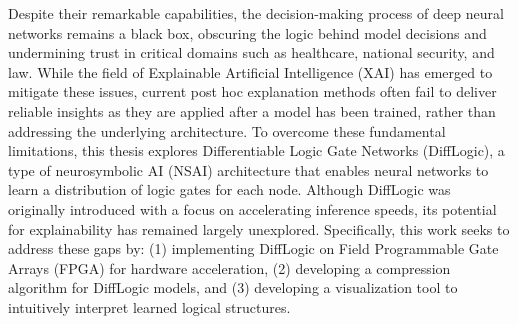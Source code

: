 
Despite their remarkable capabilities, the decision-making process of deep neural networks remains a black box, obscuring the logic behind model decisions and undermining trust in critical domains such as healthcare, national security, and law. While the field of Explainable Artificial Intelligence (XAI) has emerged to mitigate these issues, current post hoc explanation methods often fail to deliver reliable insights as they are applied after a model has been trained, rather than addressing the underlying architecture. To overcome these fundamental limitations, this thesis explores Differentiable Logic Gate Networks (DiffLogic), a type of neurosymbolic AI (NSAI) architecture that enables neural networks to learn a distribution of logic gates for each node. Although DiffLogic was originally introduced with a focus on accelerating inference speeds, its potential for explainability has remained largely unexplored. Specifically, this work seeks to address these gaps by: (1) implementing DiffLogic on Field Programmable Gate Arrays (FPGA) for hardware acceleration, (2) developing a compression algorithm for DiffLogic models, and (3) developing a visualization tool to intuitively interpret learned logical structures. 

